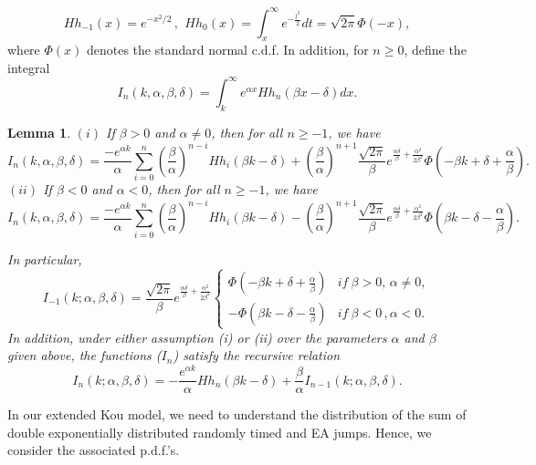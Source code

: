 \documentclass[11pt]{article}
\newtheorem{lemma}[theorem]{Lemma}
\numberwithin{equation}{section}
\numberwithin{theorem}{section}
\begin{document}
\[
Hh_{-1}\left(x\right)=  e^{-x^{2}/2}\,,\,\ Hh_{0}\left(x\right)=\int_{x}^{\infty}e^{-\frac{t^{2}}{2}}dt=\sqrt{2\pi}\Phi\left(-x\right),
\]
 where $\Phi\left(x\right)$ denotes the standard normal c.d.f. 
  In addition,      for $n\geq 0$, define  the integral
\[
I_{n}\left(k,\alpha,\beta,\delta\right)=\int_{k}^{\infty}e^{\alpha x}Hh_{n}\left(\beta x-\delta\right)dx.
\]

\begin{lemma}
$\left(i\right)$ If $\beta>0$ and $\alpha\neq0$, then for all $n\geq-1$, we have
\[
I_{n}\left(k,\alpha,\beta,\delta\right)=\frac{-e^{\alpha k}}{\alpha}\sum_{i=0}^{n}\left(\frac{\beta}{\alpha}\right)^{n-i}Hh_{i}\left(\beta k-\delta\right)+\left(\frac{\beta}{\alpha}\right)^{n+1}\frac{\sqrt{2\pi}}{\beta}e^{\frac{\alpha\delta}{\beta}+\frac{\alpha^{2}}{2\beta^{2}}}\Phi\left(-\beta k+\delta+\frac{\alpha}{\beta}\right).
\]
$\left(ii\right)$ If $\beta<0$ and $\alpha<0$, then for all $n\geq-1$, we have
\[
I_{n}\left(k,\alpha,\beta,\delta\right)=\frac{-e^{\alpha k}}{\alpha}\sum_{i=0}^{n}\left(\frac{\beta}{\alpha}\right)^{n-i}Hh_{i}\left(\beta k-\delta\right)-\left(\frac{\beta}{\alpha}\right)^{n+1}\frac{\sqrt{2\pi}}{\beta}e^{\frac{\alpha\delta}{\beta}+\frac{\alpha^{2}}{2\beta^{2}}}\Phi\left(\beta k-\delta-\frac{\alpha}{\beta}\right).
\]


In particular, 
\[
I_{-1}\left(k;\alpha,\beta,\delta\right)=\frac{\sqrt{2\pi}}{\beta}e^{\frac{\alpha\delta}{\beta}+\frac{\alpha^{2}}{2\beta^{2}}}\begin{cases}
\Phi\left(-\beta k+\delta+\frac{\alpha}{\beta}\right) & if\:\beta>0, \, \alpha\neq0,\\
-\Phi\left(\beta k-\delta-\frac{\alpha}{\beta}\right) & if\:\beta<0\,, \alpha<0.
\end{cases}
\]
 In addition, under either assumption (i) or (ii) over the parameters
$\alpha$ and $\beta$ given above,   the  functions ($I_{n}$) satisfy
the   recursive relation
\[
I_{n}\left(k;\alpha,\beta,\delta\right)=-\frac{e^{\alpha k}}{\alpha}Hh_{n}\left(\beta k-\delta\right)+\frac{\beta}{\alpha}I_{n-1}\left(k;\alpha,\beta,\delta\right).
\]
\end{lemma}

In our extended Kou model, we need to understand the distribution of the
sum of double exponentially distributed randomly timed and EA jumps. Hence, we consider the associated p.d.f.'s.
\end{document}
